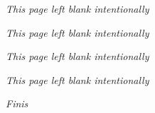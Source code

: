 \documentclass[10pt,twoside]{book}
\begin{document}
\frontmatter

\lhead[\small\thepage]{}
\rhead[]{\small\thepage}
\chead[]{}
\cfoot[]{}


\newpage
 

\newpage
 

\newpage
 

\newpage
 

\newpage
 

\newpage
 

\newpage
 

\newpage
\centerline{\small\textsl{This page left blank intentionally}}
\thispagestyle{empty}
\newpage 
\centerline{\small\textsl{This page left blank intentionally}}
\thispagestyle{empty}
\newpage 
\mainmatter

\lhead[\small\thepage\quad ]{}
\chead[]{}
\cfoot[]{}




\resumechapters
\lhead[\small\thepage\quad ]{}
\chead[]{}
\cfoot[]{}




\newpage
\centerline{\small\textsl{This page left blank intentionally}}
\thispagestyle{empty}
\newpage 
\centerline{\small\textsl{This page left blank intentionally}}
\thispagestyle{empty}
\newpage 

\newpage
\makeatletter
\renewcommand{\@idxitem}{\par\hangindent 20\p@}
\renewcommand*\subitem{\@idxitem \hspace*{10\p@}}
\renewcommand*\subsubitem{\@idxitem \hspace*{15\p@}}
\def\@makeschapterhead#1{%
  \vspace*{50\p@}%
  {\parindent \z@ \raggedleft
    \normalfont
    \interlinepenalty\@M
    \LARGE \bfseries  #1\par\nobreak
    \vskip 40\p@
  }}

\makeatother
 
\label{index}
\printindex
\vfill
\centerline{{\sl Finis}}
\vfill
\newpage
~
\thispagestyle{empty}
\newpage
~
\thispagestyle{empty}
\newpage
~
\thispagestyle{empty}
\newpage
~
\thispagestyle{empty}
\end{document}
